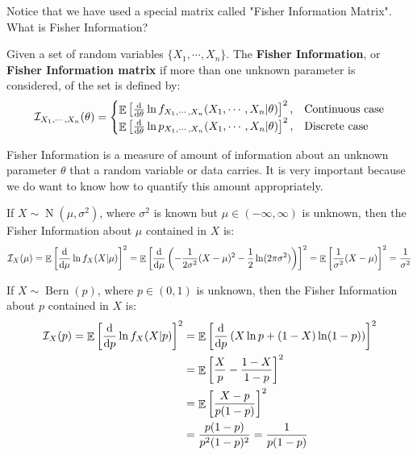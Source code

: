 \documentclass{huhtakm-template-book-v2}
\DeclareMathOperator{\E}{\mathbb{E}}
\DeclareMathOperator{\Bern}{Bern}
\DeclareMathOperator{\N}{N}
\begin{document}
Notice that we have used a special matrix called "Fisher Information Matrix". What is Fisher Information?
\begin{defn}
	Given a set of random variables $\{X_{1},\cdots,X_{n}\}$. The \textbf{Fisher Information}, or \textbf{Fisher Information matrix} if more than one unknown parameter is considered, of the set is defined by:
	\begin{equation*}
		\mathcal{I}_{X_{1},\cdots,X_{n}}(\theta)=\begin{cases}
			\E\left[\odv*{}{\theta}\ln{f_{X_{1},\cdots,X_{n}}(X_{1},\cdots,X_{n}|\theta)}\right]^{2}, &\text{Continuous case}\\
			\E\left[\odv*{}{\theta}\ln{p_{X_{1},\cdots,X_{n}}(X_{1},\cdots,X_{n}|\theta)}\right]^{2}, &\text{Discrete case}
		\end{cases}
	\end{equation*}
\end{defn}
\begin{rem}
	Fisher Information is a measure of amount of information about an unknown parameter $\theta$ that a random variable or data carries. It is very important because we do want to know how to quantify this amount appropriately.
\end{rem}
\begin{eg}
	If $X\sim\N(\mu,\sigma^{2})$, where $\sigma^{2}$ is known but $\mu\in(-\infty,\infty)$ is unknown, then the Fisher Information about $\mu$ contained in $X$ is:
	\begin{equation*}
		\mathcal{I}_{X}(\mu)=\E\left[\odv*{\ln{f_{X}(X|\mu)}}{\mu}\right]^{2}=\E\left[\odv*{}{\mu}\left(-\frac{1}{2\sigma^{2}}(X-\mu)^{2}-\frac{1}{2}\ln(2\pi\sigma^{2})\right)\right]^{2}=\E\left[\frac{1}{\sigma^{2}}(X-\mu)\right]^{2}=\frac{1}{\sigma^{2}}
	\end{equation*}
\end{eg}
\begin{eg}
	If $X\sim\Bern(p)$, where $p\in(0,1)$ is unknown, then the Fisher Information about $p$ contained in $X$ is:
	\begin{align*}
		\mathcal{I}_{X}(p)=\E\left[\odv*{\ln{f_{X}(X|p)}}{p}\right]^{2}&=\E\left[\odv*{}{p}\left(X\ln{p}+(1-X)\ln(1-p)\right)\right]^{2}\\
		&=\E\left[\frac{X}{p}-\frac{1-X}{1-p}\right]^{2}\\
		&=\E\left[\frac{X-p}{p(1-p)}\right]^{2}\\
		&=\frac{p(1-p)}{p^{2}(1-p)^{2}}=\frac{1}{p(1-p)}
	\end{align*}
\end{eg}
\end{document}
